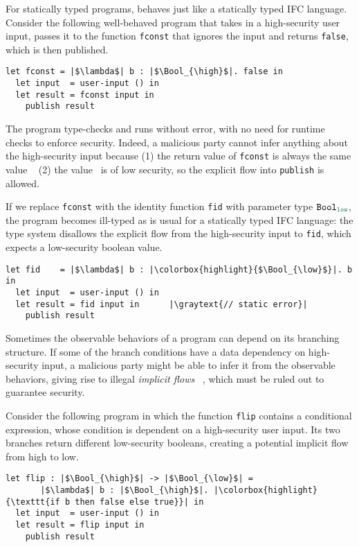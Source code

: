 For statically typed programs, \Surface behaves just like a statically
typed IFC language. Consider the following well-behaved \Surface
program that takes in a high-security user input, passes it to the
function \texttt{fconst} that ignores the input and
returns \texttt{false}, which is then published.

\begin{lstlisting}[style=tt]
  let fconst = |$\lambda$| b : |$\Bool_{\high}$|. false in
  let input  = user-input () in
  let result = fconst input in
    publish result
\end{lstlisting}

The program type-checks and runs without error, with no need for
runtime checks to enforce security. Indeed, a malicious party cannot
infer anything about the high-security input because (1) the return
value of \texttt{fconst} is always the same value \false~ (2)
the value \false~is of low security, so the explicit flow
into \texttt{publish} is allowed.

If we replace \texttt{fconst} with the identity function \texttt{fid} with
parameter type $\Bool_{\low}$, the program becomes ill-typed as is usual for a
statically typed IFC language: the type system disallows the explicit flow from
the high-security input to \texttt{fid}, which expects a low-security boolean
value.

\begin{lstlisting}[style=tt]
  let fid    = |$\lambda$| b : |\colorbox{highlight}{$\Bool_{\low}$}|. b in
  let input  = user-input () in
  let result = fid input in      |\graytext{// static error}|
    publish result
\end{lstlisting}

Sometimes the observable behaviors of a program can depend on its branching
structure. If some of the branch conditions have a data dependency on
high-security input, a malicious party might be able to infer it from the
observable behaviors, giving rise to illegal \textit{implicit flows}
~\parencite{denning1976lattice}, which must be ruled out to guarantee security.

Consider the following program in which the function \texttt{flip} contains a
conditional expression, whose condition is dependent on a high-security user
input. Its two branches return different low-security booleans, creating a
potential implicit flow from high to low.

\begin{lstlisting}[style=tt]
  let flip : |$\Bool_{\high}$| -> |$\Bool_{\low}$| =
       |$\lambda$| b : |$\Bool_{\high}$|. |\colorbox{highlight}{\texttt{if b then false else true}}| in
  let input  = user-input () in
  let result = flip input in
    publish result
\end{lstlisting}

